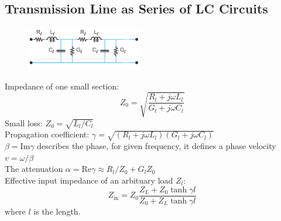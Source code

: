 \documentclass[8pt,a4paper,twocolumn]{article} %
\numberwithin{equation}{section} %
\begin{document}
		\subsection{Transmission Line as Series of LC Circuits} %
		\label{sub:transmission_line_as_series_of_lc_circuits}
			
			\begin{figure}[!h]
				\centering
				\includegraphics[width=2in]{transmissionLine.png}
				\label{pic:transmissionLine}
			\end{figure}
			Impedance of one small section:
			\begin{equation}
				Z_0=\sqrt{\frac{ R_l +j \omega L_l }{G_l + j \omega C_l}}
			\end{equation}
			Small loss: $ Z_0=\sqrt{L_l/C_l} $\\
			Propagation coefficient: $ \gamma=\sqrt{( R_l +j \omega L_l )(G_l + j \omega C_l)} $\\
			$ \beta=\text{Im} \gamma $ describes the phase, for given frequency, it defines a phase velocity $v=\omega/\beta$\\
			The attenuation $\alpha=\text{Re} \gamma \approx R_l/Z_0+G_l Z_0 $\\
			Effective input impedance of an arbituary load $ Z_l $:
			\begin{equation}
				Z_{\text{in}}=Z_0 \frac{Z_L+Z_0 \tanh \gamma l}{Z_0+Z_L\tanh \gamma l}
			\end{equation}
			where $l$ is the length.
\end{document}
